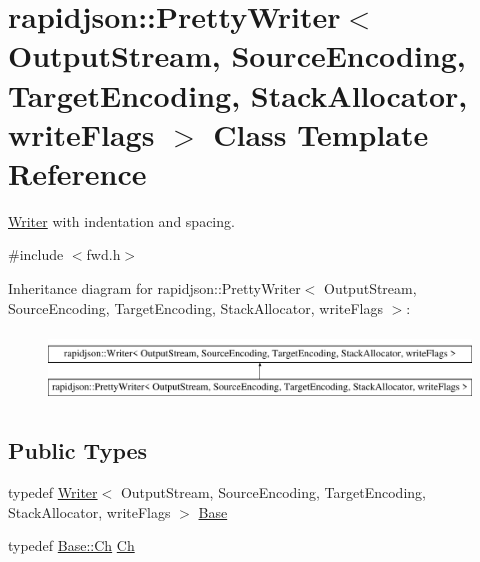 \hypertarget{classrapidjson_1_1_pretty_writer}{}\section{rapidjson\+::Pretty\+Writer$<$ Output\+Stream, Source\+Encoding, Target\+Encoding, Stack\+Allocator, write\+Flags $>$ Class Template Reference}
\label{classrapidjson_1_1_pretty_writer}


\mbox{\hyperlink{classrapidjson_1_1_writer}{Writer}} with indentation and spacing.  




{\ttfamily \#include $<$fwd.\+h$>$}

Inheritance diagram for rapidjson\+::Pretty\+Writer$<$ Output\+Stream, Source\+Encoding, Target\+Encoding, Stack\+Allocator, write\+Flags $>$\+:\begin{figure}[H]
\begin{center}
\leavevmode
\includegraphics[height=1.854305cm]{classrapidjson_1_1_pretty_writer}
\end{center}
\end{figure}
\subsection*{Public Types}
\begin{DoxyCompactItemize}
\item 
typedef \mbox{\hyperlink{classrapidjson_1_1_writer}{Writer}}$<$ Output\+Stream, Source\+Encoding, Target\+Encoding, Stack\+Allocator, write\+Flags $>$ \mbox{\hyperlink{classrapidjson_1_1_pretty_writer_a792881200bdf51add62117617e66bd49}{Base}}
\item 
typedef \mbox{\hyperlink{classrapidjson_1_1_writer_a2cf973937ca1110293bf1350fac2a6d6}{Base\+::\+Ch}} \mbox{\hyperlink{classrapidjson_1_1_pretty_writer_a74a38902073aa599c8bcc6a3ca6126d0}{Ch}}
\end{DoxyCompactItemize}
